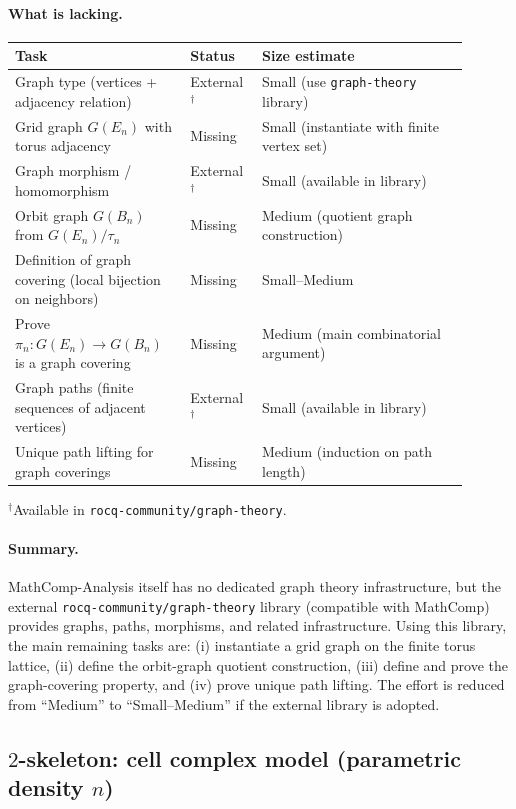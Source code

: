 \documentclass[11pt,a4paper]{article}
\theoremstyle{definition}
\theoremstyle{remark}
\begin{document}
\paragraph{What is lacking.}
\begin{center}
\begin{tabular}{p{0.35\linewidth} p{0.13\linewidth} p{0.42\linewidth}}
\hline
\textbf{Task} & \textbf{Status} & \textbf{Size estimate}\\
\hline
Graph type (vertices + adjacency relation) & External$^\dagger$ & Small (use \texttt{graph-theory} library)\\
Grid graph \(G(E_n)\) with torus adjacency & Missing & Small (instantiate with finite vertex set)\\
Graph morphism / homomorphism & External$^\dagger$ & Small (available in library)\\
Orbit graph \(G(B_n)\) from \(G(E_n)/\tau_n\) & Missing & Medium (quotient graph construction)\\
Definition of graph covering (local bijection on neighbors) & Missing & Small--Medium\\
Prove \(\pi_n:G(E_n)\to G(B_n)\) is a graph covering & Missing & Medium (main combinatorial argument)\\
Graph paths (finite sequences of adjacent vertices) & External$^\dagger$ & Small (available in library)\\
Unique path lifting for graph coverings & Missing & Medium (induction on path length)\\
\hline
\end{tabular}
\end{center}
{\small $^\dagger$Available in \texttt{rocq-community/graph-theory}.}

\paragraph{Summary.}
MathComp-Analysis itself has no dedicated graph theory infrastructure, but the external \texttt{rocq-community/graph-theory} library (compatible with MathComp) provides graphs, paths, morphisms, and related infrastructure. Using this library, the main remaining tasks are: (i) instantiate a grid graph on the finite torus lattice, (ii) define the orbit-graph quotient construction, (iii) define and prove the graph-covering property, and (iv) prove unique path lifting. The effort is reduced from ``Medium'' to ``Small--Medium'' if the external library is adopted.

\subsection{\(2\)-skeleton: cell complex model (parametric density \(n\))}
\label{app:2-skeleton}
\end{document}
